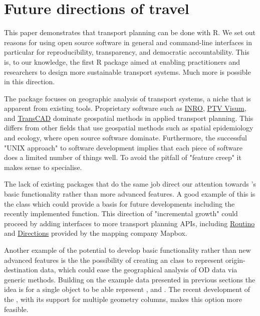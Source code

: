 \section{Future directions of travel}\label{future-directions-of-travel}

This paper demonstrates that transport planning can be done with R.
We set out reasons for using open source software in general and command-line interfaces in particular for reproducibility, transparency, and democratic accountability.
This is, to our knowledge, the first R package aimed at enabling practitioners and researchers to design more sustainable transport systems.
Much more is possible in this direction.

The  package focuses on geographic analysis of transport systems, a niche that is apparent from existing tools.
Proprietary software such as \href{https://www.inrosoftware.com/en/products/emme/}{INRO}, \href{http://vision-traffic.ptvgroup.com/en-us/products/ptv-visum/}{PTV Visum}, and  \href{http://www.caliper.com/tcovu.htm}{TransCAD} dominate geospatial methods in applied transport planning.
This differs from other fields that use geospatial methods such as spatial epidemiology and ecology, where open source software dominate.
Furthermore, the successful "UNIX approach" to software development implies that each piece of software does a limited number of things well.
To avoid the pitfall of "feature creep" it makes sense to specialise.

The lack of existing packages that do the same job direct our attention towards 's basic functionality rather than more advanced features.
A good example of this is the  class which could provide a basis for future developments including the recently implemented  function.
This direction of "incremental growth" could proceed by adding
interfaces to more transport planning APIs, including
\href{https://www.routino.org/uk/}{Routino} and
\href{https://www.mapbox.com/directions/}{Directions} provided by the mapping company Mapbox.

Another example of the potential to develop basic functionality rather than new advanced features is the the possibility of creating an  class to represent origin-destination data, which could ease the geographical analysis of OD data via generic methods.
Building on the example data presented in previous sections the idea is for a single  object to be able represent ,  and .
The recent development of the , with its support for multiple geometry columns, makes this option more feasible.

